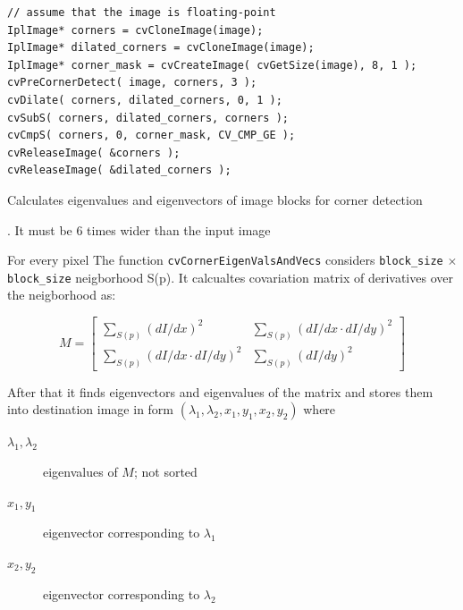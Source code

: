 \begin{lstlisting}
// assume that the image is floating-point
IplImage* corners = cvCloneImage(image);
IplImage* dilated_corners = cvCloneImage(image);
IplImage* corner_mask = cvCreateImage( cvGetSize(image), 8, 1 );
cvPreCornerDetect( image, corners, 3 );
cvDilate( corners, dilated_corners, 0, 1 );
cvSubS( corners, dilated_corners, corners );
cvCmpS( corners, 0, corner_mask, CV_CMP_GE );
cvReleaseImage( &corners );
cvReleaseImage( &dilated_corners );
\end{lstlisting}

\label{CornerEigenValsAndVecs}
Calculates eigenvalues and eigenvectors of image blocks for corner detection


\begin{description}
. It must be 6 times wider than the input image
\end{description}

For every pixel The function \texttt{cvCornerEigenValsAndVecs} considers \texttt{block\_size} $\times$ \texttt{block\_size} neigborhood S(p). It calcualtes covariation matrix of derivatives over the neigborhood as:

\[
M = \begin{bmatrix}
\sum_{S(p)}(dI/dx)^2 & \sum_{S(p)}(dI/dx \cdot dI/dy)^2 \\
\sum_{S(p)}(dI/dx \cdot dI/dy)^2 & \sum_{S(p)}(dI/dy)^2
\end{bmatrix}
\]

After that it finds eigenvectors and eigenvalues of the matrix and stores them into destination image in form
$(\lambda_1, \lambda_2, x_1, y_1, x_2, y_2)$ where
\begin{description}
\item[$\lambda_1, \lambda_2$]eigenvalues of $M$; not sorted
\item[$x_1, y_1$]eigenvector corresponding to $\lambda_1$
\item[$x_2, y_2$]eigenvector corresponding to $\lambda_2$
\end{description}

